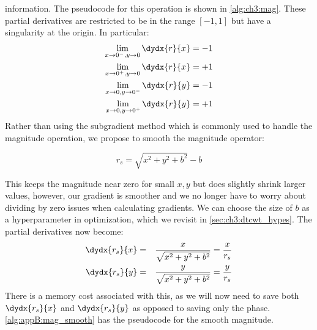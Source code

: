 information. The pseudocode for this operation is shown in
\autoref{alg:ch3:mag}.
%
These partial derivatives are restricted to be in the range $[-1, 1]$ but have a singularity at the origin.
In particular:
\begin{align}
  \lim_{x\rightarrow 0^{-},y\rightarrow 0}  \dydx{r}{x} &= -1 \\
  \lim_{x\rightarrow 0^{+},y\rightarrow 0}  \dydx{r}{x} &= +1 \\
  \lim_{x\rightarrow 0,y\rightarrow 0^{-}}  \dydx{r}{y} &= -1 \\
  \lim_{x\rightarrow 0,y\rightarrow 0^{+}}  \dydx{r}{y} &= +1
\end{align}
Rather than using the subgradient method \cite{boyd_subgradient_2003} which is
commonly used to handle the magnitude operation, we propose to smooth the
magnitude operator:

\begin{equation}\label{eq:ch3:magbias}
 r_s = \sqrt{x^2 + y^2 + b^2} - b
\end{equation}

This keeps the magnitude near zero for small $x,y$ but does slightly shrink larger
values, however, our gradient is smoother and we no
longer have to worry about dividing by zero issues when calculating gradients.
We can choose the size of $b$ as a hyperparameter in optimization, which we
revisit in \autoref{sec:ch3:dtcwt_hypes}. The partial derivatives now become:
\begin{eqnarray}
  \dydx{r_s}{x} & = & \frac{x}{\sqrt{x^2 + y^2+b^2}} = \frac{x}{r_s}\\
  \dydx{r_s}{y} & = & \frac{y}{\sqrt{x^2 + y^2+b^2}} = \frac{y}{r_s}
\end{eqnarray}
There is a memory cost associated with this, as we will now need to save both
$\dydx{r_s}{x}$ and $\dydx{r_s}{y}$ as opposed to saving only the phase.
\autoref{alg:appB:mag_smooth} has the pseudocode for the smooth magnitude.


